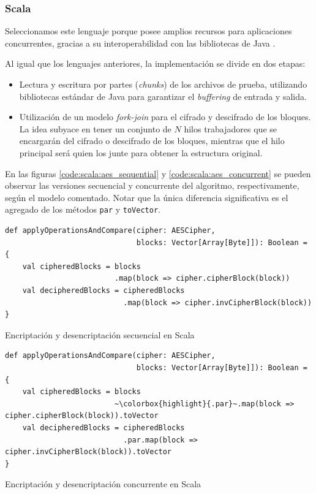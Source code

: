 \documentclass[11pt]{article}
\let\Oldsubsubsection\subsubsection
\renewcommand{\subsubsection}{\FloatBarrier\Oldsubsubsection}
\newcommand{\english}[1]{\textit{#1}}
\begin{document}
\subsubsection{Scala}

Seleccionamos este lenguaje porque posee amplios recursos para aplicaciones concurrentes, gracias a su interoperabilidad con las bibliotecas de Java \cite{scala:ex:why_scala_3}.

Al igual que los lenguajes anteriores, la implementación se divide en dos etapas:

\begin{itemize}
    \item Lectura y escritura por partes (\english{chunks}) de los archivos de prueba, utilizando bibliotecas estándar de Java para garantizar el \english{buffering} de entrada y salida.
    \item Utilización de un modelo \english{fork-join} para el cifrado y descifrado de los bloques. La idea subyace en tener un conjunto de $N$ hilos trabajadores que se encargarán del cifrado o descifrado de los bloques, mientras que el hilo principal será quien los junte para obtener la estructura original.
\end{itemize}

En las figuras \ref{code:scala:aes_sequential} y \ref{code:scala:aes_concurrent} se pueden observar las versiones secuencial y concurrente del algoritmo, respectivamente, según el modelo comentado. Notar que la única diferencia significativa es el agregado de los métodos \lstinline{par} y \lstinline{toVector}.

\begin{listing}[h]
\begin{verbatim}
def applyOperationsAndCompare(cipher: AESCipher,
                              blocks: Vector[Array[Byte]]): Boolean = {
    val cipheredBlocks = blocks
                         .map(block => cipher.cipherBlock(block))
    val decipheredBlocks = cipheredBlocks
                           .map(block => cipher.invCipherBlock(block))
}
\end{verbatim}
\caption{Encriptación y desencriptación secuencial en Scala}
\label{code:scala:aes_sequential}
\end{listing}


\begin{listing}[h]
\begin{verbatim}
def applyOperationsAndCompare(cipher: AESCipher,
                              blocks: Vector[Array[Byte]]): Boolean = {
    val cipheredBlocks = blocks
                         ~\colorbox{highlight}{.par}~.map(block => cipher.cipherBlock(block)).toVector
    val decipheredBlocks = cipheredBlocks
                           .par.map(block => cipher.invCipherBlock(block)).toVector
}
\end{verbatim}
\caption{Encriptación y desencriptación concurrente en Scala}
\label{code:scala:aes_concurrent}
\end{listing}
\end{document}
